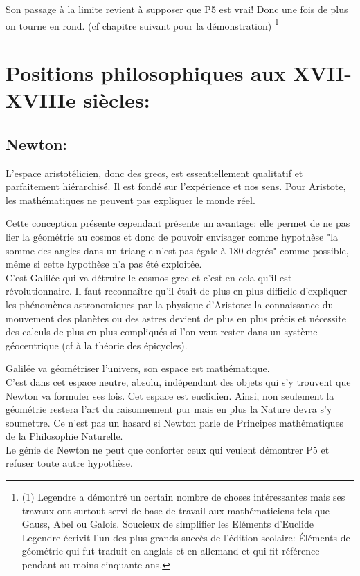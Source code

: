\documentclass[a4paper, 12pt, twoside]{book}
\begin{document}
   
   
   
   
    Son passage à la limite  revient à supposer que P5 est vrai! Donc une fois de plus on tourne en rond. (cf chapitre suivant pour la démonstration)\bigskip 
   \bigskip
   \bigskip
   \bigskip 
 \footnote{(1) Legendre a démontré un certain nombre de choses intéressantes mais ses travaux ont surtout servi de base de travail aux mathématiciens tels que Gauss, Abel ou Galois. Soucieux de simplifier les Eléments d'Euclide Legendre écrivit l'un des plus grands succès de l'édition scolaire:  Éléments de géométrie qui fut traduit en anglais et en allemand et qui fit référence pendant au moins cinquante ans.}   


\chapter{Positions philosophiques aux XVII-XVIIIe siècles:}

\section{Newton:
    }
 L’espace aristotélicien, donc des grecs, est essentiellement qualitatif et parfaitement hiérarchisé. Il est fondé sur l'expérience et nos sens. Pour Aristote, les mathématiques ne peuvent pas  expliquer le monde réel.\
 
 Cette conception présente cependant présente un avantage: elle permet de ne pas lier la géométrie au cosmos et donc de pouvoir envisager comme hypothèse "la somme des angles dans un triangle n'est pas égale à 180 degrés" comme possible, même si cette hypothèse n'a pas été exploitée.\\
 
 
    C'est Galilée qui va détruire le cosmos grec et c'est en cela qu'il est révolutionnaire. Il faut reconnaître qu'il était de plus en plus difficile d'expliquer les phénomènes astronomiques par la physique d'Aristote: la connaissance du mouvement des planètes ou des astres devient de plus en plus précis et nécessite des calculs de plus en plus compliqués si l'on veut rester dans un système géocentrique (cf à la théorie des épicycles).\
    
     Galilée va géométriser l'univers, son espace est mathématique.\\
    
    C'est dans cet espace neutre, absolu, indépendant des objets qui s'y trouvent que Newton va formuler ses lois. Cet espace est euclidien. Ainsi, non seulement la géométrie restera l'art du raisonnement pur mais en plus la Nature devra s'y soumettre. Ce n'est pas un hasard si Newton parle de Principes mathématiques de la Philosophie Naturelle. \\
    Le génie de Newton ne peut que conforter ceux qui veulent démontrer P5 et refuser toute autre hypothèse. \\
  
\end{document}
